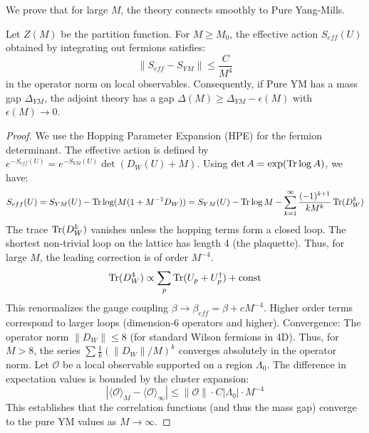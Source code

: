 We prove that for large $M$, the theory connects smoothly to Pure Yang-Mills.

\begin{theorem}
\label{thm:decoupling}
Let $Z(M)$ be the partition function. For $M \ge M_0$, the effective action $S_{eff}(U)$ obtained by integrating out fermions satisfies:
\begin{equation}
\| S_{eff} - S_{YM} \| \le \frac{C}{M^4}
\end{equation}
in the operator norm on local observables.
Consequently, if Pure YM has a mass gap $\Delta_{YM}$, the adjoint theory has a gap $\Delta(M) \ge \Delta_{YM} - \epsilon(M)$ with $\epsilon(M) \to 0$.
\end{theorem}

\begin{proof}
We use the Hopping Parameter Expansion (HPE) for the fermion determinant.
The effective action is defined by $e^{-S_{eff}(U)} = e^{-S_{YM}(U)} \det(D_W(U) + M)$.
Using $\det A = \exp(\operatorname{Tr} \log A)$, we have:
\begin{equation}
S_{eff}(U) = S_{YM}(U) - \operatorname{Tr} \log(M(1 + M^{-1} D_W)) = S_{YM}(U) - \operatorname{Tr} \log M - \sum_{k=1}^\infty \frac{(-1)^{k+1}}{k M^k} \operatorname{Tr}(D_W^k)
\end{equation}
The trace $\operatorname{Tr}(D_W^k)$ vanishes unless the hopping terms form a closed loop. The shortest non-trivial loop on the lattice has length 4 (the plaquette).
Thus, for large $M$, the leading correction is of order $M^{-4}$.
\begin{equation}
\operatorname{Tr}(D_W^4) \propto \sum_p \operatorname{Tr}(U_p + U_p^\dagger) + \text{const}
\end{equation}
This renormalizes the gauge coupling $\beta \to \beta_{eff} = \beta + c M^{-4}$.
Higher order terms correspond to larger loops (dimension-6 operators and higher).
Convergence: The operator norm $\|D_W\| \le 8$ (for standard Wilson fermions in 4D).
Thus, for $M > 8$, the series $\sum \frac{1}{k} (\|D_W\|/M)^k$ converges absolutely in the operator norm.
Let $\mathcal{O}$ be a local observable supported on a region $\Lambda_0$.
The difference in expectation values is bounded by the cluster expansion:
\begin{equation}
|\langle \mathcal{O} \rangle_M - \langle \mathcal{O} \rangle_\infty| \le \|\mathcal{O}\| \cdot C |\Lambda_0| \cdot M^{-4}
\end{equation}
This establishes that the correlation functions (and thus the mass gap) converge to the pure YM values as $M \to \infty$.
\end{proof}

